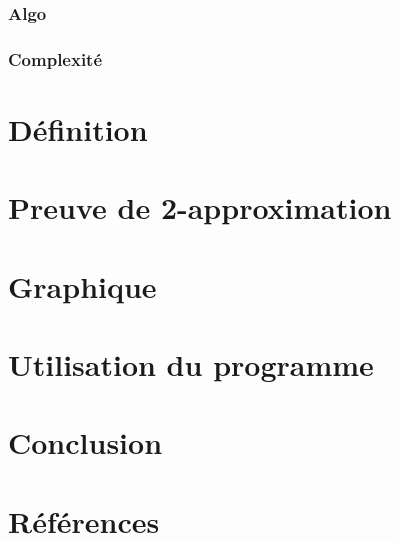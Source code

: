 \documentclass[a4paper,11pt]{article}
\begin{document}
\subsubsection*{Algo}
\subsubsection*{Complexité}

\section{Définition} %

\section{Preuve de 2-approximation} %

\section{Graphique} %

\section{Utilisation du programme} %

\section{Conclusion} %

\section{Références}
\end{document}
